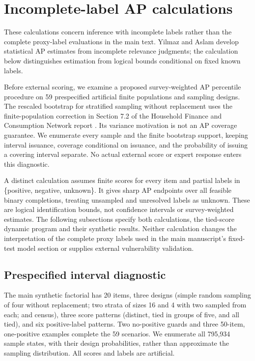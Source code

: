 \documentclass[preprint,12pt]{elsarticle}
\begin{document}
\section{Incomplete-label AP calculations}\label{incomplete-label-ap-calculations}

These calculations concern inference with incomplete labels rather than the complete proxy-label evaluations in the main text. Yilmaz and Aslam \cite{yilmaz2008incomplete} develop statistical AP estimates from incomplete relevance judgments; the calculation below distinguishes estimation from logical bounds conditional on fixed known labels.

Before external scoring, we examine a proposed survey-weighted AP percentile procedure on 59 prespecified artificial finite populations and sampling designs. The rescaled bootstrap for stratified sampling without replacement uses the finite-population correction in Section 7.2 of the Household Finance and Consumption Network report \cite{hfcn2023methodological}. Its variance motivation is not an AP coverage guarantee. We enumerate every sample and the finite bootstrap support, keeping interval issuance, coverage conditional on issuance, and the probability of issuing a covering interval separate. No actual external score or expert response enters this diagnostic.

A distinct calculation assumes finite scores for every item and partial labels in \{positive, negative, unknown\}. It gives sharp AP endpoints over all feasible binary completions, treating unsampled and unresolved labels as unknown. These are logical identification bounds, not confidence intervals or survey-weighted estimates. The following subsections specify both calculations, the tied-score dynamic program and their synthetic results. Neither calculation changes the interpretation of the complete proxy labels used in the main manuscript's fixed-test model section or supplies external vulnerability validation.

\subsection{Prespecified interval diagnostic}\label{prespecified-interval-diagnostic}

The main synthetic factorial has 20 items, three designs (simple random sampling of four without replacement; two strata of sizes 16 and 4 with two sampled from each; and census), three score patterns (distinct, tied in groups of five, and all tied), and six positive-label patterns. Two no-positive guards and three 50-item, one-positive examples complete the 59 scenarios. We enumerate all 795,934 sample states, with their design probabilities, rather than approximate the sampling distribution. All scores and labels are artificial.
\end{document}
